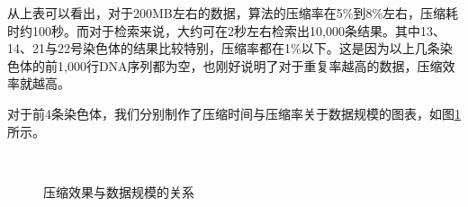 ﻿\documentclass{sysuthesis}
\begin{document}
从上表可以看出，对于200MB左右的数据，算法的压缩率在5\%到8\%左右，压缩耗时约100秒。而对于检索来说，大约可在2秒左右检索出10,000条结果。其中13、14、21与22号染色体的结果比较特别，压缩率都在1\%以下。这是因为以上几条染色体的前1,000行DNA序列都为空，也刚好说明了对于重复率越高的数据，压缩效率就越高。\par
对于前4条染色体，我们分别制作了压缩时间与压缩率关于数据规模的图表，如图\ref{fig:cchart}所示。\par

\begin{figure}[htbp]
	\centering
	\\
	\caption{压缩效果与数据规模的关系}\label{fig:cchart}
\end{figure}
\end{document}
